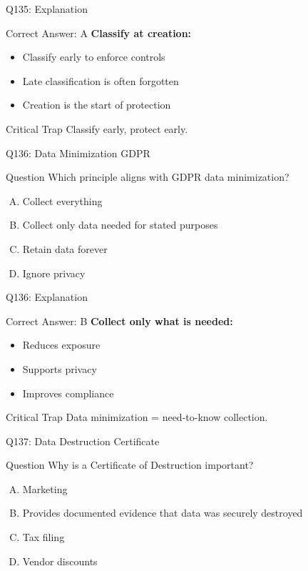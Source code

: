 \documentclass{beamer}
\begin{document}
	\begin{frame}{Q135: Explanation}
		\begin{block}{Correct Answer: A}
			\textbf{Classify at creation:}
			\begin{itemize}
				\item Classify early to enforce controls
				\item Late classification is often forgotten
				\item Creation is the start of protection
			\end{itemize}
		\end{block}
		\begin{alertblock}{Critical Trap}
			Classify early, protect early.
		\end{alertblock}
	\end{frame}
	
	\begin{frame}{Q136: Data Minimization GDPR}
		\begin{block}{Question}
			Which principle aligns with GDPR data minimization?
		\end{block}
		\begin{enumerate}[(A)]
			\item Collect everything
			\item Collect only data needed for stated purposes
			\item Retain data forever
			\item Ignore privacy
		\end{enumerate}
	\end{frame}
	
	\begin{frame}{Q136: Explanation}
		\begin{block}{Correct Answer: B}
			\textbf{Collect only what is needed:}
			\begin{itemize}
				\item Reduces exposure
				\item Supports privacy
				\item Improves compliance
			\end{itemize}
		\end{block}
		\begin{alertblock}{Critical Trap}
			Data minimization = need-to-know collection.
		\end{alertblock}
	\end{frame}
	
	\begin{frame}{Q137: Data Destruction Certificate}
		\begin{block}{Question}
			Why is a Certificate of Destruction important?
		\end{block}
		\begin{enumerate}[(A)]
			\item Marketing
			\item Provides documented evidence that data was securely destroyed
			\item Tax filing
			\item Vendor discounts
		\end{enumerate}
	\end{frame}
	
\end{document}
